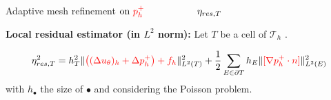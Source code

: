 \begin{frame}[noframenumbering]{Adaptive mesh refinement}
    \hspace{45pt}$\text{on }\textcolor{red}{p_h^+}\hspace{55pt}\eta_{res,T}$

    \vspace{8pt}
    \textbf{Local residual estimator (in $L^2$ norm):} Let $T$ be a cell of $\mathcal{T}_h$ .

    \vspace{-8pt}
    $$\eta_{res,T}^2 = h_T^2 \|\textcolor{red}{\big((\Delta u_\theta)_h + \Delta p_h^+\big) + f_h}\|_{L^2(T)}^2 + \frac{1}{2} \sum_{E \in \partial T} h_E \|\textcolor{red}{[\nabla p_h^+\cdot n]}\|_{L^2(E)}^2$$
    with $h_\bullet$ the size of $\bullet$ and considering the Poisson problem.
\end{frame}

